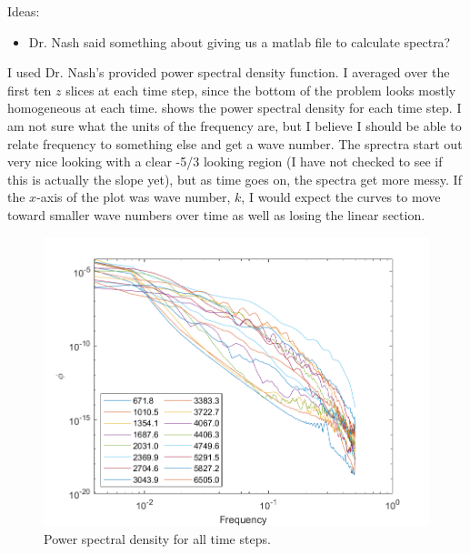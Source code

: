 \documentclass[11pt]{article}
\begin{document}
\begin{enumerate}
    Ideas:
    \begin{itemize}
        \item Dr. Nash said something about giving us a matlab file to calculate spectra?
    \end{itemize}


	I used Dr. Nash's provided power spectral density function. I averaged over the first ten $z$ slices at each time step, since the bottom of the problem looks mostly homogeneous at each time.  shows the power spectral density for each time step. I am not sure what the units of the frequency are, but I believe I should be able to relate frequency to something else and get a wave number. The sprectra start out very nice looking with a clear -5/3 looking region (I have not checked to see if this is actually the slope yet), but as time goes on, the spectra get more messy. If the $x$-axis of the plot was wave number, $k$, I would expect the curves to move toward smaller wave numbers over time as well as losing the linear section. 

	\begin{figure}[htbp]
		\centering
		\includegraphics[width=\textwidth]{1-plots/psd_plot.png}
		\caption{Power spectral density for all time steps.}
		\label{fig:psd}
	\end{figure}



\end{enumerate}
\end{document}
